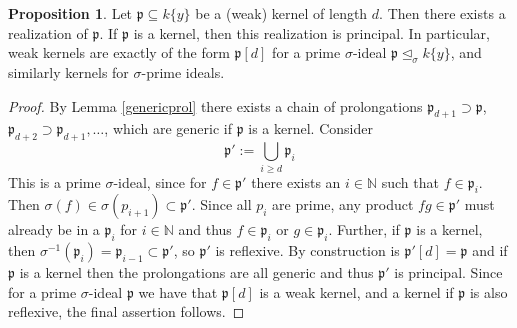 \documentclass{article}
\def\N{\mathbb{N}}
\def\p{\mathfrak{p}}
\def\s{\sigma}
\def\si{\unlhd_{\sigma}}
\def\fa{\text{ for all }}
\newenvironment{bew}{\begin{proof}[Proof]}{\end{proof}}
\theoremstyle{definition}
\newtheorem{prop}[Satz]{Proposition}
\newtheorem{lem}[Satz]{Lemma}
\begin{document}
\begin{prop}
Let $\p \subseteq k\{y\}$ be a (weak) kernel of length $d$. Then there exists a realization of $\p$. If $\p$ is a kernel, then this realization is principal.
In particular, weak kernels are exactly of the form $\p[d]$ for a prime $\s$-ideal $\p \si k\{y\}$, and similarly kernels for $\s$-prime ideals.
\begin{bew}
By Lemma \ref{genericprol} there exists a chain of prolongations $\p_{d+1} \supset \p$, $\p_{d+2} \supset \p_{d+1}, \ldots$, which are generic if $\p$ is a kernel.
Consider \[ \p':= \bigcup_{i \geq d} \p_i \]
This is a prime $\s$-ideal, since for $f \in \p'$ there exists an $i \in \N$ such that $f \in \p_i$. Then $\s(f) \in \s(p_{i+1}) \subset \p'$.
Since all $p_i$ are prime, any product $fg \in \p'$ must already be in a $\p_i$ for $i \in \N$ and thus $f \in \p_i$ or $g \in \p_i$. Further,
 if $\p$ is a kernel, then $\s^{-1}(\p_i) = \p_{i-1} \subset \p'$, so $\p'$ is reflexive. By construction is $\p'[d] = \p$ and if $\p$ is a kernel then the
 prolongations are all generic and thus $\p'$ is principal. Since for a prime $\s$-ideal $\p$ we have that $\p[d]$ is a weak kernel, and a kernel if $\p$ is also reflexive, 
the final assertion follows.
\end{bew}
\end{prop}

\end{document}
